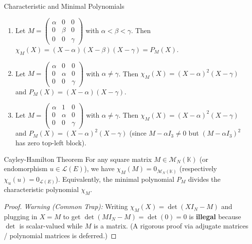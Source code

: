 \documentclass[11pt, a4paper]{article}
\begin{document}
\begin{example}{Characteristic and Minimal Polynomials}{}
\begin{enumerate}
    \item Let $M = \begin{pmatrix} \alpha & 0 & 0 \\ 0 & \beta & 0 \\ 0 & 0 & \gamma \end{pmatrix}$ with $\alpha < \beta < \gamma$. Then $\chi_M(X) = (X-\alpha)(X-\beta)(X-\gamma) = P_M(X)$.
    \item Let $M = \begin{pmatrix} \alpha & 0 & 0 \\ 0 & \alpha & 0 \\ 0 & 0 & \gamma \end{pmatrix}$ with $\alpha \neq \gamma$. Then $\chi_M(X) = (X-\alpha)^2(X-\gamma)$ and $P_M(X) = (X-\alpha)(X-\gamma)$.
    \item Let $M = \begin{pmatrix} \alpha & 1 & 0 \\ 0 & \alpha & 0 \\ 0 & 0 & \gamma \end{pmatrix}$ with $\alpha \neq \gamma$. Then $\chi_M(X) = (X-\alpha)^2(X-\gamma)$ and $P_M(X) = (X-\alpha)^2(X-\gamma)$ (since $M - \alpha I_3 \neq 0$ but $(M - \alpha I_3)^2$ has zero top-left block).
\end{enumerate}
\end{example}

\begin{theorem}{Cayley-Hamilton Theorem}{}
For any square matrix $M \in \mathcal{M}_N(\mathbb{K})$ (or endomorphism $u \in \mathcal{L}(E)$), we have $\chi_M(M) = 0_{\mathcal{M}_N(\mathbb{K})}$ (respectively $\chi_u(u) = 0_{\mathcal{L}(E)}$). Equivalently, the minimal polynomial $P_M$ divides the characteristic polynomial $\chi_M$.
\end{theorem}
\begin{proof}
\textit{Warning (Common Trap):} Writing $\chi_M(X) = \det(X I_N - M)$ and plugging in $X = M$ to get $\det(M I_N - M) = \det(0) = 0$ is \textbf{illegal} because $\det$ is scalar-valued while $M$ is a matrix. (A rigorous proof via adjugate matrices / polynomial matrices is deferred.)
\end{proof}
\end{document}
